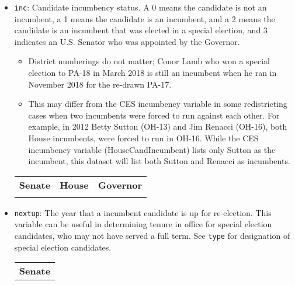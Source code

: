 \documentclass[12pt]{article}
\begin{document}
\begin{itemize}[leftmargin=*]
\item \texttt{inc}: Candidate incumbency status. A 0 means the candidate is not an incumbent, a 1 means the candidate is an incumbent, and a 2 means the candidate is an incumbent that was elected in a special election, and 3 indicates an U.S. Senator who was appointed by the Governor.
\begin{itemize}
\item District numberings do not matter; Conor Lamb who won a special election to PA-18 in March 2018 is still an incumbent when he ran in November 2018 for the re-drawn PA-17.
\item This may differ from the CES incumbency variable in some redistricting cases when two incumbents were forced to run against each other. For example, in 2012 Betty Sutton (OH-13) and Jim Renacci (OH-16), both House incumbents, were forced to run in OH-16. While the CES incumbency variable (HouseCandIncumbent) lists only Sutton as the incumbent, this dataset will list both Sutton and Renacci as incumbents. 
\end{itemize}

    \begin{tabularx}{\linewidth}{CCC}
    \textbf{Senate} & \textbf{House} & \textbf{Governor}\\
     &  & 
    \end{tabularx}


\item \texttt{nextup}: The year that a incumbent candidate is up for re-election. This variable can be useful in determining tenure in office for special election candidates, who may not have served a full term. See \texttt{type} for designation of special election candidates. 		

\begin{tabularx}{\linewidth}{C}
\textbf{Senate}\\

\end{tabularx}


\end{itemize}
\end{document}
